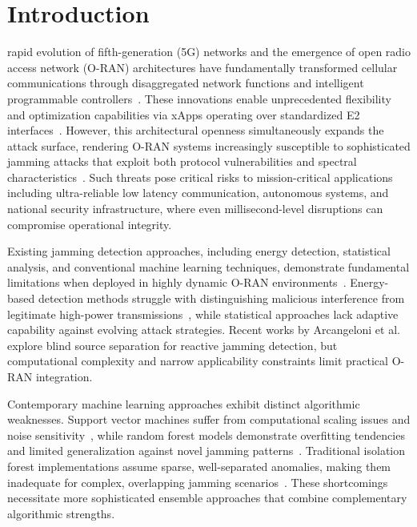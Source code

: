 \documentclass[journal]{IEEEtran}
\begin{document}
\IEEEpeerreviewmaketitle
 \section{Introduction}
 rapid evolution of fifth-generation (5G) networks and the emergence of open radio access network (O-RAN) architectures have fundamentally transformed cellular communications through disaggregated network functions and intelligent programmable controllers~\cite{Bonati2022}. These innovations enable unprecedented flexibility and optimization capabilities via xApps operating over standardized E2 interfaces~\cite{Mungari2025}. However, this architectural openness simultaneously expands the attack surface, rendering O-RAN systems increasingly susceptible to sophisticated jamming attacks that exploit both protocol vulnerabilities and spectral characteristics~\cite{sapavath2023, Azuka2024}. Such threats pose critical risks to mission-critical applications including ultra-reliable low latency communication, autonomous systems, and national security infrastructure, where even millisecond-level disruptions can compromise operational integrity.

Existing jamming detection approaches, including energy detection, statistical analysis, and conventional machine learning techniques, demonstrate fundamental limitations when deployed in highly dynamic O-RAN environments~\cite{kryszkiewicz2023, Boucka2025testbed, balakrishnan2024}. Energy-based detection methods struggle with distinguishing malicious interference from legitimate high-power transmissions~\cite{kryszkiewicz2023}, while statistical approaches lack adaptive capability against evolving attack strategies. Recent works by Arcangeloni et al.~\cite{Arcangeloni2023} explore blind source separation for reactive jamming detection, but computational complexity and narrow applicability constraints limit practical O-RAN integration.

Contemporary machine learning approaches exhibit distinct algorithmic weaknesses. Support vector machines suffer from computational scaling issues and noise sensitivity~\cite{Lin2024}, while random forest models demonstrate overfitting tendencies and limited generalization against novel jamming patterns~\cite{Toai2023}. Traditional isolation forest implementations assume sparse, well-separated anomalies, making them inadequate for complex, overlapping jamming scenarios~\cite{dimou2025}. These shortcomings necessitate more sophisticated ensemble approaches that combine complementary algorithmic strengths.
\end{document}
